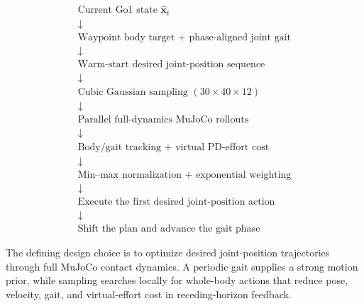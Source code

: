 \documentclass[11pt,a4paper]{article}
\begin{document}
\begin{equation*}
\boxed{
\begin{array}{c}
\text{Current Go1 state }\hat{\bm{x}}_t\\
\downarrow\\
\text{Waypoint body target + phase-aligned joint gait}\\
\downarrow\\
\text{Warm-start desired joint-position sequence}\\
\downarrow\\
\text{Cubic Gaussian sampling }(30\times40\times12)\\
\downarrow\\
\text{Parallel full-dynamics MuJoCo rollouts}\\
\downarrow\\
\text{Body/gait tracking + virtual PD-effort cost}\\
\downarrow\\
\text{Min--max normalization + exponential weighting}\\
\downarrow\\
\text{Execute the first desired joint-position action}\\
\downarrow\\
\text{Shift the plan and advance the gait phase}
\end{array}}
\end{equation*}

The defining design choice is to optimize desired joint-position trajectories
through full MuJoCo contact dynamics.  A periodic gait supplies a strong
motion prior, while sampling searches locally for whole-body actions that
reduce pose, velocity, gait, and virtual-effort cost in receding-horizon
feedback.
\end{document}
